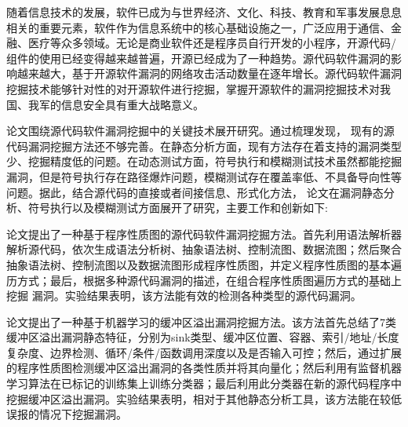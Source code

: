 \begin{cabstract}
随着信息技术的发展，软件已成为与世界经济、文化、科技、教育和军事发展息息相关的重要元素，软件作为信息系统中的核心基础设施之一，广泛应用于通信、金融、医疗等众多领域。无论是商业软件还是程序员自行开发的小程序，开源代码/组件的使用已经变得越来越普遍，开源已经成为了一种趋势。源代码软件漏洞的影响越来越大，基于开源软件漏洞的网络攻击活动数量在逐年增长。源代码软件漏洞挖掘技术能够针对性的对开源软件进行挖掘，掌握开源软件的漏洞挖掘技术对我国、我军的信息安全具有重大战略意义。

论文围绕源代码软件漏洞挖掘中的关键技术展开研究。通过梳理发现， %
现有的源代码漏洞挖掘方法还不够完善。在静态分析方面，现有方法存在着支持的漏洞类型少、挖掘精度低的问题。在动态测试方面，符号执行和模糊测试技术虽然都能挖掘漏洞，但是符号执行存在路径爆炸问题，模糊测试存在覆盖率低、不具备导向性等问题。据此，结合源代码的直接或者间接信息、形式化方法，
论文在漏洞静态分析、符号执行以及模糊测试方面展开了研究，主要工作和创新如下:


论文提出了一种基于程序性质图的源代码软件漏洞挖掘方法。首先利用语法解析器解析源代码，依次生成语法分析树、抽象语法树、控制流图、数据流图；然后聚合抽象语法树、控制流图以及数据流图形成程序性质图，并定义程序性质图的基本遍历方式；最后，根据多种源代码漏洞的描述，在组合程序性质图遍历方式的基础上挖掘
漏洞。实验结果表明，该方法能有效的检测各种类型的源代码漏洞。

论文提出了一种基于机器学习的缓冲区溢出漏洞挖掘方法。该方法首先总结了7类缓冲区溢出漏洞静态特征，分别为sink类型、缓冲区位置、容器、索引/地址/长度复杂度、边界检测、循环/条件/函数调用深度以及是否输入可控；然后，通过扩展的程序性质图检测缓冲区溢出漏洞的各类性质并将其向量化；然后利用有监督机器学习算法在已标记的训练集上训练分类器；最后利用此分类器在新的源代码程序中挖掘缓冲区溢出漏洞。实验结果表明，相对于其他静态分析工具，该方法能在较低误报的情况下挖掘漏洞。


\end{cabstract}

